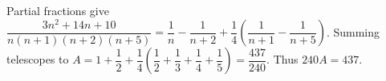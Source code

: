 Partial fractions give $\dfrac{3n^2+14n+10}{n(n+1)(n+2)(n+5)}=\dfrac{1}{n}-\dfrac{1}{n+2}+\dfrac{1}{4}(\dfrac{1}{n+1}-\dfrac{1}{n+5})$. Summing telescopes to $A=1+\dfrac{1}{2}+\dfrac{1}{4}(\dfrac{1}{2}+\dfrac{1}{3}+\dfrac{1}{4}+\dfrac{1}{5})=\dfrac{437}{240}$. Thus $\boxed{240A=437}$.
